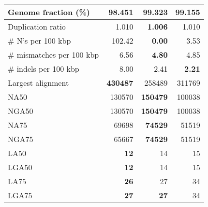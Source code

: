 \documentclass[12pt,a4paper]{article}
\begin{document}
\begin{table}[ht]
\begin{center}
\begin{tabular}{|l*{3}{|r}|}
Genome fraction (\%) & 98.451 & {\bf 99.323} & 99.155 \\ \hline
Duplication ratio & 1.010 & {\bf 1.006} & 1.010 \\ \hline
\# N's per 100 kbp & 102.42 & {\bf 0.00} & 3.53 \\ \hline
\# mismatches per 100 kbp & 6.56 & {\bf 4.80} & 4.85 \\ \hline
\# indels per 100 kbp & 8.00 & 2.41 & {\bf 2.21} \\ \hline
Largest alignment & {\bf 430487} & 258489 & 311769 \\ \hline
NA50 & 130570 & {\bf 150479} & 100038 \\ \hline
NGA50 & 130570 & {\bf 150479} & 100038 \\ \hline
NA75 & 69698 & {\bf 74529} & 51519 \\ \hline
NGA75 & 65667 & {\bf 74529} & 51519 \\ \hline
LA50 & {\bf 12} & 14 & 15 \\ \hline
LGA50 & {\bf 12} & 14 & 15 \\ \hline
LA75 & {\bf 26} & 27 & 34 \\ \hline
LGA75 & {\bf 27} & {\bf 27} & 34 \\ \hline
\end{tabular}
\end{center}
\end{table}
\end{document}
